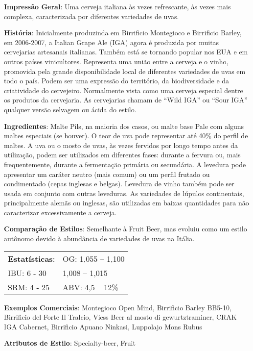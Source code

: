 \textbf{Impressão Geral}: Uma cerveja italiana às vezes refrescante, às vezes mais complexa, caracterizada por diferentes variedades de uvas.

\textbf{História}: Inicialmente produzinda em Birrificio Montegioco e Birrificio Barley, em 2006-2007, a Italian Grape Ale (IGA) agora é produzida por muitas cervejarias artesanais italianas. Também está se tornando popular nos EUA e em outros países vinicultores. Representa uma união entre a cerveja e o vinho, promovida pela grande disponibilidade local de diferentes variedades de uvas em todo o país. Podem ser uma expressão do território, da biodiversidade e da criatividade do cervejeiro. Normalmente vista como uma cerveja especial dentre os produtos da cervejaria. As cervejarias chamam de “Wild IGA” ou “Sour IGA” qualquer versão selvagem ou ácida do estilo.

\textbf{Ingredientes}: Malte Pils, na maioria dos casos, ou malte base Pale com alguns maltes especiais (se houver). O teor de uva pode representar até 40\% do perfil de maltes. A uva ou o mosto de uvas, às vezes fervidos por longo tempo antes da utilização, podem ser utilizados em diferentes fases: durante a fervura ou, mais frequentemente, durante a fermentação primária ou secundária. A levedura pode apresentar um caráter neutro (mais comum) ou um perfil frutado ou condimentado (cepas inglesas e belgas). Levedura de vinho também pode ser usada em conjunto com outras leveduras. As variedades de lúpulos continentais, principalmente alemãs ou inglesas, são utilizadas em baixas quantidades para não caracterizar excessivamente a cerveja.

\textbf{Comparação de Estilos}: Semelhante à Fruit Beer, mas evoluiu como um estilo autônomo devido à abundância de variedades de uvas na Itália.

\begin{tabular}{@{}p{35mm}p{35mm}@{}}
  \textbf{Estatísticas}: & OG: 1,055 – 1,100 \\
  IBU: 6 - 30 & 1,008 – 1,015 \\
  SRM: 4 - 25 & ABV: 4,5 – 12\%
\end{tabular}

\textbf{Exemplos Comerciais}: Montegioco Open Mind, Birrificio Barley BB5-10, Birrificio del Forte Il Tralcio, Viess Beer al mosto di gewurtztraminer, CRAK IGA Cabernet, Birrificio Apuano Ninkasi, Luppolajo Mons Rubus

\textbf{Atributos de Estilo}: Specialty-beer, Fruit
